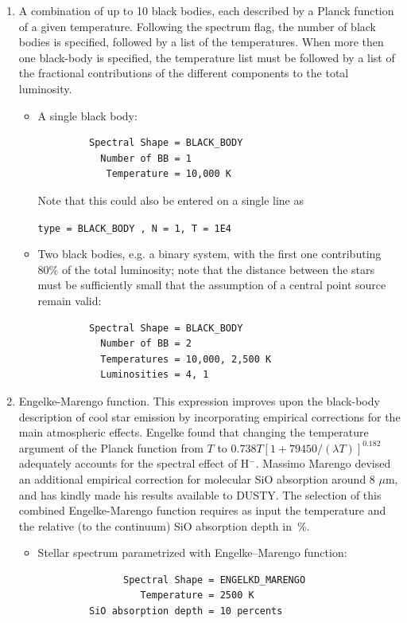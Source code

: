\documentclass[11pt]{article}
\def\mic    {\hbox{$\mu$m}}
\begin{document}
\begin{enumerate}
%
\item
A combination of up to 10 black bodies, each described by a Planck function of
a given temperature. Following the spectrum flag, the number of black bodies is
specified, followed by a list of the temperatures.  When more then one
black-body is specified, the temperature list must be followed by a list of the
fractional contributions of the different components to the total luminosity.
%
\begin{itemize}
%
\item
A single black body:
\begin{verbatim}
         Spectral Shape = BLACK_BODY
           Number of BB = 1
            Temperature = 10,000 K
\end{verbatim}

Note that this could also be entered on a single line as

\hskip 1in {\tt type = BLACK\_BODY , N = 1, T = 1E4}

\item
Two black bodies, e.g. a binary system, with the first one contributing
80\% of the total luminosity; note that the distance between the stars must be
sufficiently small that the assumption of a central point source remain valid:
\begin{verbatim}
         Spectral Shape = BLACK_BODY
           Number of BB = 2
           Temperatures = 10,000, 2,500 K
           Luminosities = 4, 1
\end{verbatim}

\end{itemize}

\item
Engelke-Marengo function.  This expression improves upon the black-body
description of cool star emission by incorporating empirical corrections for
the main atmospheric effects. Engelke \cite{Engelk} found that changing the
temperature argument of the Planck function from $T$ to $0.738T[1 +
79450/(\lambda T)]^{0.182}$ adequately accounts for the spectral effect of
H$^-$. Massimo Marengo \cite{Mareng} devised an additional empirical correction
for molecular SiO absorption around 8 \mic, and has kindly made his results
available to DUSTY. The selection of this combined Engelke-Marengo function
requires as input the temperature and the relative (to the continuum) SiO
absorption depth in~\%.

\begin{itemize}
\item
Stellar spectrum parametrized with Engelke--Marengo function:
\begin{verbatim}
               Spectral Shape = ENGELKD_MARENGO
                  Temperature = 2500 K
         SiO absorption depth = 10 percents
\end{verbatim}
\end{itemize}


\end{enumerate}
\end{document}
